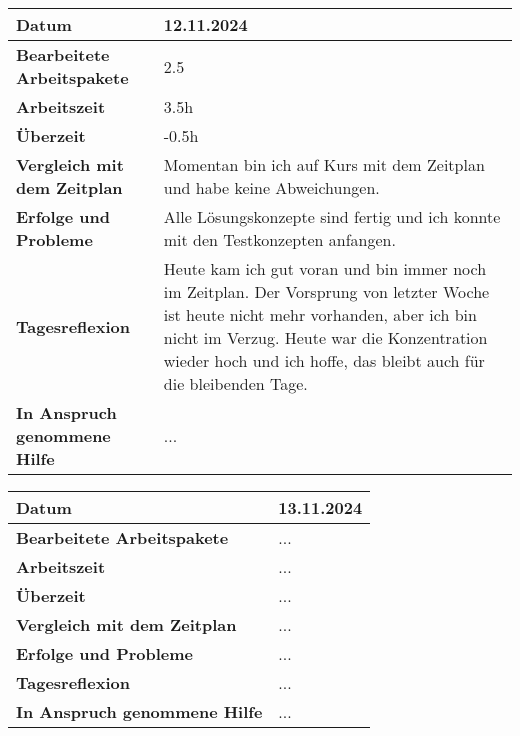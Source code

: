 \begin{longtable}{p{}|p{}}
	\hline
	\textbf{Datum}                       & 12.11.2024            \\
	\hline
	\textbf{Bearbeitete Arbeitspakete}   & 2.5                  \\
	\hline
	\textbf{Arbeitszeit}                 & 3.5h                                    \\
	\hline
	\textbf{Überzeit}                    & -0.5h                                    \\
	\hline
	\textbf{Vergleich mit dem Zeitplan}  & Momentan bin ich auf Kurs mit dem Zeitplan und habe keine Abweichungen. \\
	\hline
	\textbf{Erfolge und Probleme} & Alle Lösungskonzepte sind fertig und ich konnte mit den Testkonzepten anfangen.
	\\
	\hline
	\textbf{Tagesreflexion} & Heute kam ich gut voran und bin immer noch im Zeitplan. Der Vorsprung von letzter Woche ist heute nicht mehr vorhanden, aber ich bin nicht im Verzug. Heute war die Konzentration wieder hoch und ich hoffe, das bleibt auch für die bleibenden Tage.
	\\
	\hline
	\textbf{In Anspruch genommene Hilfe} & ...                              \\
	\hline
\end{longtable}\label{tab:arbeitsprotokoll-12.11.2024}
\newpage

\begin{longtable}{p{}|p{}}
	\hline
	\textbf{Datum}                       & 13.11.2024            \\
	\hline
	\textbf{Bearbeitete Arbeitspakete}   & ...                  \\
	\hline
	\textbf{Arbeitszeit}                 & ...                                    \\
	\hline
	\textbf{Überzeit}                    & ...                                    \\
	\hline
	\textbf{Vergleich mit dem Zeitplan}  & ... \\
	\hline
	\textbf{Erfolge und Probleme} & ...
	\\
	\hline
	\textbf{Tagesreflexion} & ...
	\\
	\hline
	\textbf{In Anspruch genommene Hilfe} & ...                              \\
	\hline
\end{longtable}\label{tab:arbeitsprotokoll-13.11.2024}
\newpage

